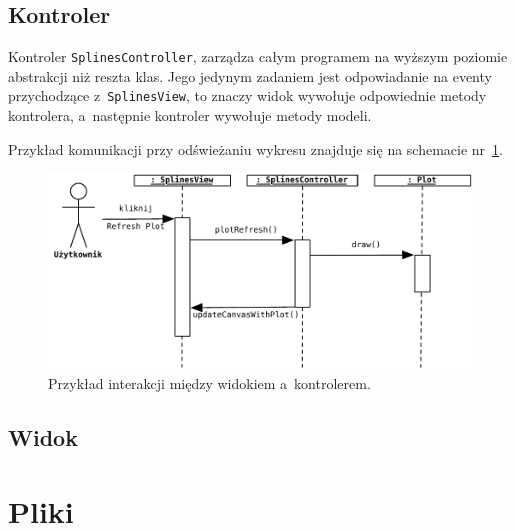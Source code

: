 \documentclass[10pt,a4paper]{article}
\newcommand{\f}[1]{\texttt{#1}}
\begin{document}
\subsection{Kontroler}

Kontroler \f{SplinesController}, zarządza całym programem na wyższym poziomie
abstrakcji niż reszta klas. Jego jedynym zadaniem jest odpowiadanie na eventy
przychodzące z~\f{SplinesView}, to znaczy widok wywołuje odpowiednie metody
kontrolera, a~następnie kontroler wywołuje metody modeli.

Przykład komunikacji przy odświeżaniu wykresu znajduje się na schemacie
nr~\ref{fig:wykres-rysuj}.

\begin{figure}[ht]
  \begin{adjustwidth}{-2cm}{-2cm}
    \centering
    \includegraphics{figury/wykres-rysuj}
    \caption{Przykład interakcji między widokiem a~kontrolerem.}
    \label{fig:wykres-rysuj}
  \end{adjustwidth}
\end{figure}

\subsection{Widok}

\section{Pliki}
\end{document}
